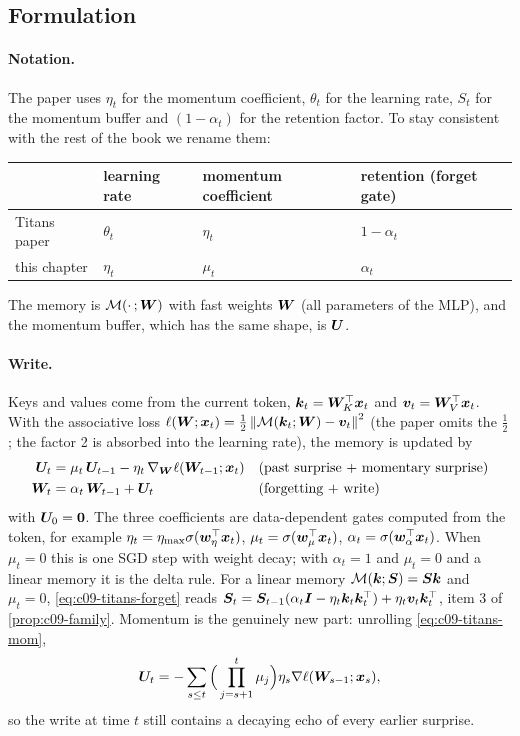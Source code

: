 \subsection{Formulation}

\paragraph{Notation.} The paper uses $\eta_t$ for the momentum coefficient, $\theta_t$ for the
learning rate, $S_t$ for the momentum buffer and $(1-\alpha_t)$ for the retention factor.
To stay consistent with the rest of the book we rename them:
\begin{center}\small
\begin{tabular}{@{}llll@{}}
\toprule
 & learning rate & momentum coefficient & retention (forget gate) \\
\midrule
Titans paper & $\theta_t$ & $\eta_t$ & $1 - \alpha_t$ \\
this chapter & $\eta_t$ & $\mu_t$ & $\alpha_t$ \\
\bottomrule
\end{tabular}
\end{center}
The memory is $\mathcal{M}(\cdot\,;\bm{W})$ with fast weights $\bm{W}$ (all parameters of the MLP),
and the momentum buffer, which has the same shape, is $\bm{U}$.

\paragraph{Write.} Keys and values come from the current token, $\bm{k}_t = \bm{W}_K^{\top}\bm{x}_t$ and
$\bm{v}_t = \bm{W}_V^{\top}\bm{x}_t$. With the associative loss
$\ell(\bm{W};\bm{x}_t) = \frac12\left\lVert \mathcal{M}(\bm{k}_t;\bm{W}) - \bm{v}_t\right\rVert^2$ (the paper omits the
$\frac12$; the factor 2 is absorbed into the learning rate), the memory is updated by
\begin{align}
  \bm{U}_t &= \mu_t\, \bm{U}_{t-1} - \eta_t\, \nabla_{\bm{W}}\ell(\bm{W}_{t-1}; \bm{x}_t)
     && \text{(past surprise + momentary surprise)} \label{eq:c09-titans-mom}\\
  \bm{W}_t &= \alpha_t\, \bm{W}_{t-1} + \bm{U}_t
     && \text{(forgetting + write)} \label{eq:c09-titans-forget}
\end{align}
with $\bm{U}_0 = \bm{0}$. The three coefficients are data-dependent gates computed from the token,
for example $\eta_t = \eta_{\max}\sigma(\bm{w}_\eta^{\top}\bm{x}_t)$, $\mu_t = \sigma(\bm{w}_\mu^{\top}\bm{x}_t)$,
$\alpha_t = \sigma(\bm{w}_\alpha^{\top}\bm{x}_t)$. When $\mu_t = 0$ this is one SGD step with weight
decay; with $\alpha_t = 1$ and $\mu_t = 0$ and a linear memory it is the delta rule.
For a linear memory $\mathcal{M}(\bm{k};\bm{S}) = \bm{S}\bm{k}$ and $\mu_t = 0$,
\eqref{eq:c09-titans-forget} reads $\bm{S}_t = \bm{S}_{t-1}(\alpha_t\bm{I} - \eta_t\bm{k}_t\bm{k}_t^{\top}) +
\eta_t\bm{v}_t\bm{k}_t^{\top}$, item 3 of \cref{prop:c09-family}. Momentum is the genuinely new part:
unrolling \eqref{eq:c09-titans-mom},
\begin{equation}
  \bm{U}_t = -\sum_{s \le t} \Big(\prod_{j=s+1}^{t}\mu_j\Big)\eta_s\nabla\ell(\bm{W}_{s-1};\bm{x}_s),
\end{equation}
so the write at time $t$ still contains a decaying echo of every earlier surprise.

